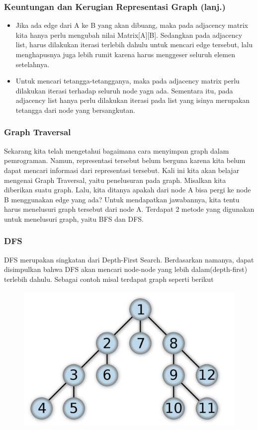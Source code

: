 \begin{frame}
\frametitle{Keuntungan dan Kerugian Representasi Graph (lanj.)}
\begin{itemize}
  \item Jika ada edge dari A ke B yang akan dibuang, maka pada adjacency matrix kita hanya perlu mengubah nilai Matrix[A][B]. Sedangkan pada adjacency list, harus dilakukan iterasi terlebih dahulu untuk mencari edge tersebut, lalu menghapusnya juga lebih rumit karena harus menggeser seluruh elemen setelahnya.
  \item Untuk mencari tetangga-tetangganya, maka pada adjacency matrix perlu dilakukan iterasi terhadap seluruh node yagn ada. Sementara itu, pada adjacency list hanya perlu dilakukan iterasi pada list yang isinya merupakan tetangga dari node yang bersangkutan.
\end{itemize}
\end{frame}

\begin{frame}
\frametitle{Graph Traversal}

Sekarang kita telah mengetahui bagaimana cara menyimpan graph dalam pemrograman. Namun, representasi tersebut belum berguna karena kita belum dapat mencari informasi dari representasi tersebut.\newline\newline
Kali ini kita akan belajar mengenai \alert{Graph Traversal}, yaitu penelusuran pada graph. Misalkan kita diberikan suatu graph. Lalu, kita ditanya apakah dari node A bisa pergi ke node B menggunakan edge yang ada? Untuk mendapatkan jawabannya, kita tentu harus menelusuri graph tersebut dari node A.\newline\newline
Terdapat 2 metode yang digunakan untuk menelusuri graph, yaitu BFS dan DFS.
\end{frame}

\begin{frame}
\frametitle{DFS}

\alert{DFS} merupakan singkatan dari Depth-First Search. Berdasarkan namanya, dapat disimpulkan bahwa DFS akan mencari node-node yang lebih dalam(depth-first) terlebih dahulu. Sebagai contoh misal terdapat graph seperti berikut

\begin{figure}
  \centering
  \includegraphics[width=6 cm]{asset/dfs.png}
\end{figure}
\end{frame}

